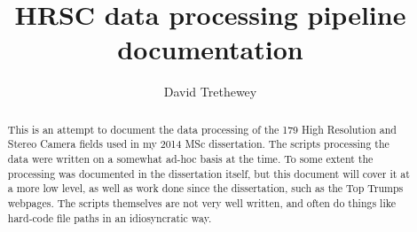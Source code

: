 \documentclass[a4paper,12pt]{article}
\title{HRSC data processing pipeline documentation}
\author{David Trethewey}
\begin{document}
\maketitle

\begin{abstract}
This is an attempt to document the data processing of the 179 High Resolution 
and Stereo Camera fields used in my 2014 MSc dissertation. The scripts processing the data were written on 
a somewhat ad-hoc basis at the time. To some extent the processing was documented in the dissertation itself, but this document will cover it at a more low level, as well as work done since the dissertation, such as the Top Trumps webpages. The scripts themselves are not very well written, and often do things like hard-code file paths in an idiosyncratic way.
\end{abstract}
\end{document}
